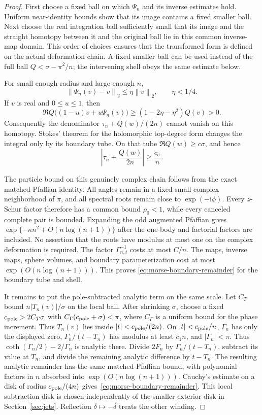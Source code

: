 \documentclass[11pt]{article}
\numberwithin{equation}{section}
\theoremstyle{definition}
\newcommand{\ii}{\mathrm i}
\newcommand{\norm}[1]{\left\lVert#1\right\rVert}
\begin{document}
\begin{proof}
First choose a fixed ball on which $\Psi_n$ and its inverse estimates
hold.  Uniform near-identity bounds show that its image contains a
fixed smaller ball.  Next choose the real integration ball sufficiently
small that its image and the straight homotopy between it and the
original ball lie in this common inverse-map domain.  This order of
choices ensures that the transformed form is defined on the actual
deformation chain.  A fixed smaller ball can be used instead of the
full ball $Q<\sigma-\pi^2/n$; the intervening shell obeys the same
estimate below.

For small enough radius and large enough $n$,
\[
 \norm{\Psi_n(v)-v}_2\le\eta\norm v_2,\qquad \eta<1/4.
\]
If $v$ is real and $0\le u\le1$, then
\begin{equation}
 \Re Q\bigl((1-u)v+u\Psi_n(v)\bigr)
 \ge(1-2\eta-\eta^2)Q(v)>0.
 \label{eq:morse-homotopy-positive}
\end{equation}
Consequently the denominator $\tau_n+Q(w)/(2n)$ cannot vanish on
this homotopy.  Stokes' theorem for the holomorphic top-degree form
changes the integral only by its boundary tube.  On that tube
$\Re Q(w)\ge c\sigma$, and hence
\[
 \left|\tau_n+\frac{Q(w)}{2n}\right|\ge\frac{c_\sigma}{n}.
\]

The particle bound on this genuinely complex chain follows from the
exact matched-Pfaffian identity.  All angles remain in a fixed small
complex neighborhood of $\pi$, and all spectral roots remain close
to $\exp(-\ii\phi)$.  Every $z$-Schur factor therefore has a common
bound $\rho_0<1$, while every canceled complete pair is bounded.
Expanding the odd augmented Pfaffian gives
$\exp\{-\kappa n^2+O(n\log(n+1))\}$ after the one-body and factorial
factors are included.  No assertion that the roots have modulus at
most one on the complex deformation is required.  The factor
$\Gamma_{n,t}^{-1}$ costs at most $C/n$.  The maps, inverse maps,
sphere volumes, and boundary parameterization cost at most
$\exp(O(n\log(n+1)))$.  This proves
\eqref{eq:morse-boundary-remainder} for the boundary tube and shell.

It remains to put the pole-subtracted analytic term on the same scale.  Let $C_T$
bound $n|T_n(v)|/\sigma$ on the local ball. After shrinking $\sigma$,
choose a fixed $c_{\rm pole}>2C_T\sigma$ with
$C_\Gamma(c_{\rm pole}+\sigma)<\pi$, where $C_\Gamma$ is a uniform
bound for the phase increment. Thus $T_n(v)$ lies inside
$|t|<c_{\rm pole}/(2n)$. On $|t|<c_{\rm pole}/n$,
$\Gamma_n$ has only the displayed zero,
$\Gamma_n/(t-T_n)$ has modulus at least $c_1n$, and
$|\Gamma_n|<\pi$.  Thus
$\coth(\Gamma_n/2)-2/\Gamma_n$ is analytic there.  Divide
$2F_n$ by $\Gamma_n/(t-T_n)$, subtract its value at $T_n$, and
divide the remaining analytic difference by $t-T_n$.
The resulting analytic remainder has the same matched-Pfaffian
bound, with polynomial factors in $n$ absorbed into
$\exp(O(n\log(n+1)))$.  Cauchy's estimate on a disk of radius
$c_{\rm pole}/(4n)$ gives~\eqref{eq:morse-boundary-remainder}. This
local subtraction disk is chosen independently of the smaller exterior
disk in Section~\ref{sec:jets}. Reflection
$\delta\mapsto-\delta$ treats the other winding.
\end{proof}
\end{document}
